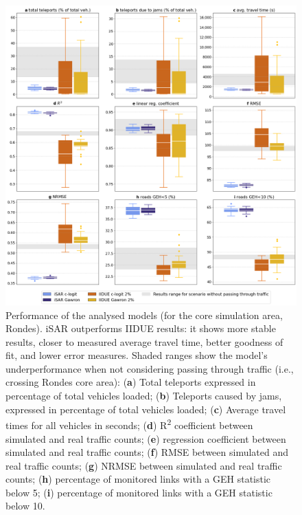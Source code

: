 \begin{figure}[htbp!]
    \centering
    \includegraphics[width=1\textwidth]{fig_07.png}
    \caption{Performance of the analysed models (for the core simulation area, Rondes). iSAR outperforms IIDUE results: it shows more stable results, closer to measured average travel time, better goodness of fit, and lower error measures. Shaded ranges show the model’s underperformance when not considering passing through traffic (i.e., crossing Rondes core area): (\textbf{a}) Total teleports expressed in percentage of total vehicles loaded; (\textbf{b}) Teleports caused by jams, expressed in percentage of total vehicles loaded; (\textbf{c}) Average travel times for all vehicles in seconds; (\textbf{d}) R\textsuperscript{2} coefficient between simulated and real traffic counts; (\textbf{e}) regression coefficient between simulated and real traffic counts; (\textbf{f}) RMSE between simulated and real traffic counts; (\textbf{g}) NRMSE between simulated and real traffic counts; (\textbf{h}) percentage of monitored links with a GEH statistic below 5; (\textbf{i}) percentage of monitored links with a GEH statistic below 10.}
   \label{fig:getting_real_07_performance_results}
\end{figure}

